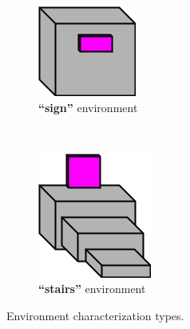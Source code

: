 \documentclass[conference]{IEEEtran}
\begin{document}
\begin{figure}[t]
    \begin{subfigure}[t]{0.15\textwidth}
        \includegraphics[width=\textwidth]{images/HighFreeEnvironment.png}
        \caption{\textbf{``sign''} environment}
    \end{subfigure} \ \ \ \ \ \
    \begin{subfigure}[t]{0.15\textwidth}
        \includegraphics[width=\textwidth]{images/LedgeEnvironment.png}
        \caption{\textbf{``stairs''} environment}
    \end{subfigure}
      \caption{Environment characterization types.}
      \label{fig:characters}
   \end{figure}
\end{document}
